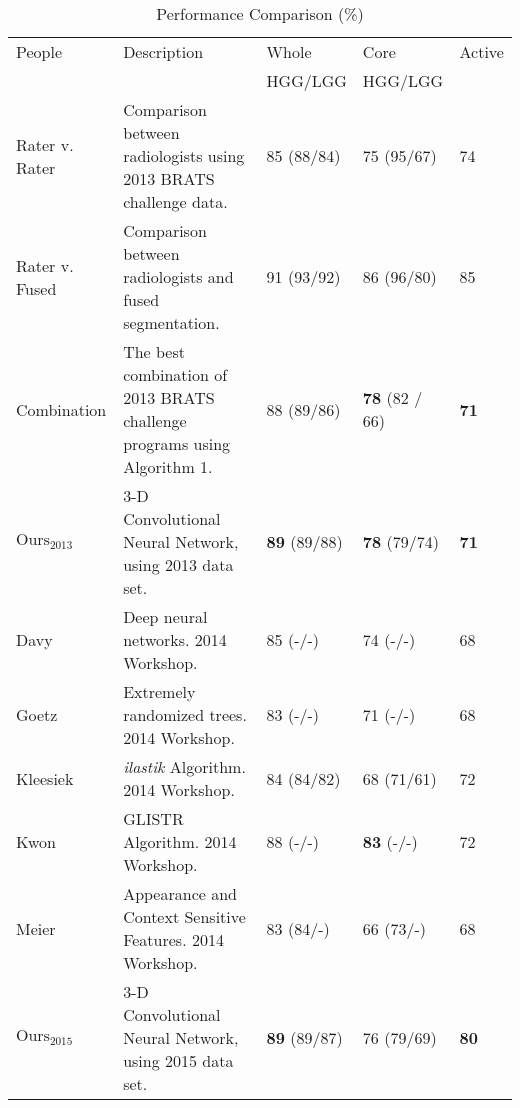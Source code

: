 \documentclass{llncs}
\begin{document}
\begin{table}[h]
\caption{Performance Comparison (\%)}\label{table:Comparison}
\begin{center}
\begin{tabular}{L{2cm}|L{5cm}|L{2cm}|L{2cm}|C{1cm}}
\toprule
People&Description&Whole&Core&Active\\
& & \hspace*{\fill} HGG/LGG \normalsize & \hspace*{\fill} HGG/LGG& \\
\midrule
\midrule
Rater v. Rater & Comparison between radiologists using 2013 BRATS challenge data. & 85 \hfill (88/84) & 75 \hfill (95/67) & 74\\
Rater v. Fused & Comparison between radiologists and fused segmentation. & 91 \hfill (93/92) & 86 \hfill (96/80) & 85\\
Combination & The best combination of 2013 BRATS challenge programs using Algorithm 1. & 88 \hfill (89/86) & \textbf{78} \hfill (82 / 66) & \textbf{71} \\
\midrule
$\text{Ours}_{\text{2013}}$ & 3-D Convolutional Neural Network, using 2013 data set. & \textbf{89} \hfill (89/88) & \textbf{78} \hfill (79/74) & \textbf{71}\\
\midrule
\midrule
  Davy & Deep neural networks.  2014 Workshop. & 85 \hfill (-/-) & 74 \hfill (-/-) & 68 \\
Goetz & Extremely randomized trees.  2014 Workshop. & 83 \hfill (-/-) & 71 \hfill (-/-) & 68\\
Kleesiek & \emph{ilastik} Algorithm. 2014 Workshop. & 84 \hfill (84/82) & 68 \hfill (71/61) & 72\\
Kwon & GLISTR Algorithm.  2014 Workshop. & 88 \hfill (-/-) & \textbf{83} \hfill (-/-) & 72\\
Meier & Appearance and Context Sensitive Features.  2014 Workshop.  & 83 \hfill (84/-) & 66 \hfill (73/-) & 68\\
\midrule
$\text{Ours}_{\text{2015}}$ & 3-D Convolutional Neural Network, using 2015 data set. & \textbf{89} \hfill (89/87) & 76 \hfill (79/69) & \textbf{80}\\
\midrule
\midrule
\end{tabular}
\end{center}
\end{table}
\end{document}
